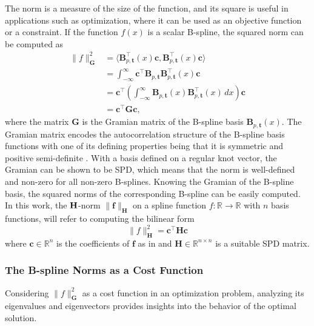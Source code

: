 The norm is a measure of the size of the function, and its square is useful in applications such as optimization, where it can be used as an objective function or a constraint. If the function $f(x)$ is a scalar B-spline, the squared norm can be computed as
\begin{equation}
    \label{eq:norm-spline}
    \begin{aligned}
        \|f\|_\mathbf G^2 &= \langle\mathbf B_{p, \mathbf t}^\top(x) \mathbf c, \mathbf B_{p, \mathbf t}^\top(x) \mathbf c\rangle \\
        &= \int_{-\infty}^\infty \mathbf c^\top \mathbf B_{p, \mathbf t}\mathbf B_{p, \mathbf t}^\top(x) \mathbf c \\
        &= \mathbf c^\top \left(\int_{-\infty}^\infty \mathbf B_{p, \mathbf t}(x) \mathbf B_{p, \mathbf t}^\top(x) \, dx\right) \mathbf c \\
        &= \mathbf c^\top \mathbf G \mathbf c,
\end{aligned}
\end{equation}
where the matrix $\mathbf G$ is the Gramian matrix of the B-spline basis $\mathbf B_{p, \mathbf t}(x)$. The Gramian matrix encodes the autocorrelation  structure of the B-spline basis functions with one of its defining properties being that it is symmetric and positive semi-definite \citep{horn2013positive}. With a basis defined on a regular knot vector, the Gramian can be shown to be \acrfull{SPD}, which means that the norm is well-defined and non-zero for all non-zero B-splines.  Knowing the Gramian of the B-spline basis, the squared norms of the corresponding B-spline can be easily computed. In this work, the $\bf H$-norm $\|\mathbf f\|_\mathbf H$ on a spline function $f: \mathbb R\to\mathbb R$ with $n$ basis functions, will refer to computing the bilinear form
\begin{equation}\label{eq:b-spline-norm}
    \|f\|_\mathbf H^2 = \mathbf{c}^\top \mathbf H \mathbf {c}
\end{equation}
where $\mathbf{c}\in\mathbb R^{n}$ is the coefficients of $\mathbf f$ as in and $\mathbf H\in\mathbb R^{n\times n}$ is a suitable SPD matrix. 



\subsubsection{The B-spline Norms as a Cost Function}\label{sec:b-spline-norms-as-cost-functions}
Considering $\|f\|_\mathbf G^2$ as a cost function in an optimization problem, analyzing its eigenvalues and eigenvectors provides insights into the behavior of the optimal solution.


